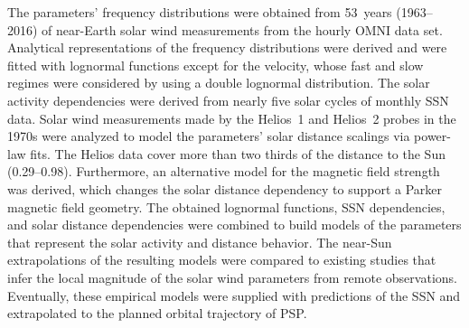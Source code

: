 The parameters' frequency distributions were obtained from 53~years (1963--2016) of near-Earth solar wind measurements from the hourly OMNI data set. Analytical representations of the frequency distributions were derived and were fitted with lognormal functions except for the velocity, whose fast and slow regimes were considered by using a double lognormal distribution. The solar activity dependencies were derived from nearly five solar cycles of monthly SSN data. Solar wind measurements made by the Helios~1 and Helios~2 probes in the 1970s were analyzed to model the parameters' solar distance scalings via power-law fits. The Helios data cover more than two thirds of the distance to the Sun (\SIrange{0.29}{0.98}{\au}). Furthermore, an alternative model for the magnetic field strength was derived, which changes the solar distance dependency to support a Parker magnetic field geometry.
The obtained lognormal functions, SSN dependencies, and solar distance dependencies were combined to build models of the parameters that represent the solar activity and distance behavior. The near-Sun extrapolations of the resulting models were compared to existing studies that infer the local magnitude of the solar wind parameters from remote observations. Eventually, these empirical models were supplied with predictions of the SSN and extrapolated to the planned orbital trajectory of PSP.

\medskip

